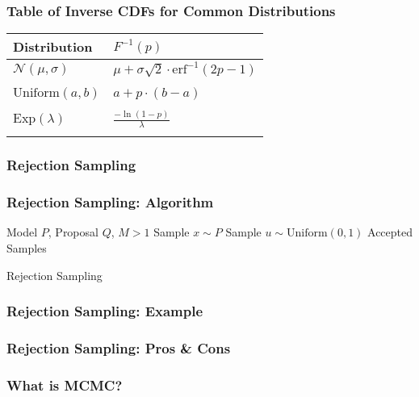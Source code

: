 \documentclass{beamer}
\begin{document}
\begin{frame}
\frametitle{Table of Inverse CDFs for Common Distributions}
\begin{center}
\begin{tabular}{C{5cm}C{5cm}}
\toprule
{Distribution} & $F^{-1}(p)$ \\
\midrule
$\mathcal{N}(\mu, \sigma)$   &  $\mu + \sigma \sqrt{2} \cdot \text{erf}^{-1}\left( 2p - 1 \right)$ \\
\\
$\text{Uniform}(a, b)$   &  $a + p \cdot \left( b - a \right)$ \\
\\
$\text{Exp}(\lambda)$   &  $\frac{- \ln \left( 1 - p \right)}{\lambda}$ \\
\\
\bottomrule
\end{tabular}
\end{center}
\end{frame}




\begin{frame}
\frametitle{Rejection Sampling}
\end{frame}


\begin{frame}
\frametitle{Rejection Sampling: Algorithm}
\begin{algorithm}[H]
\begin{algorithmic}[1]
  \REQUIRE Model $P$, Proposal $Q$, $M > 1$
  \STATE Sample $x \sim P$
  \STATE Sample $u \sim \text{Uniform}(0, 1)$
  \ELSE
  \ENDIF
  \ENSURE Accepted Samples
\end{algorithmic}
\caption{Rejection Sampling}
\end{algorithm}
\end{frame}


\begin{frame}
\frametitle{Rejection Sampling: Example}
\end{frame}


\begin{frame}
\frametitle{Rejection Sampling: Pros \& Cons}
\end{frame}




\begin{frame}
\frametitle{What is MCMC?}
\end{frame}
\end{document}
